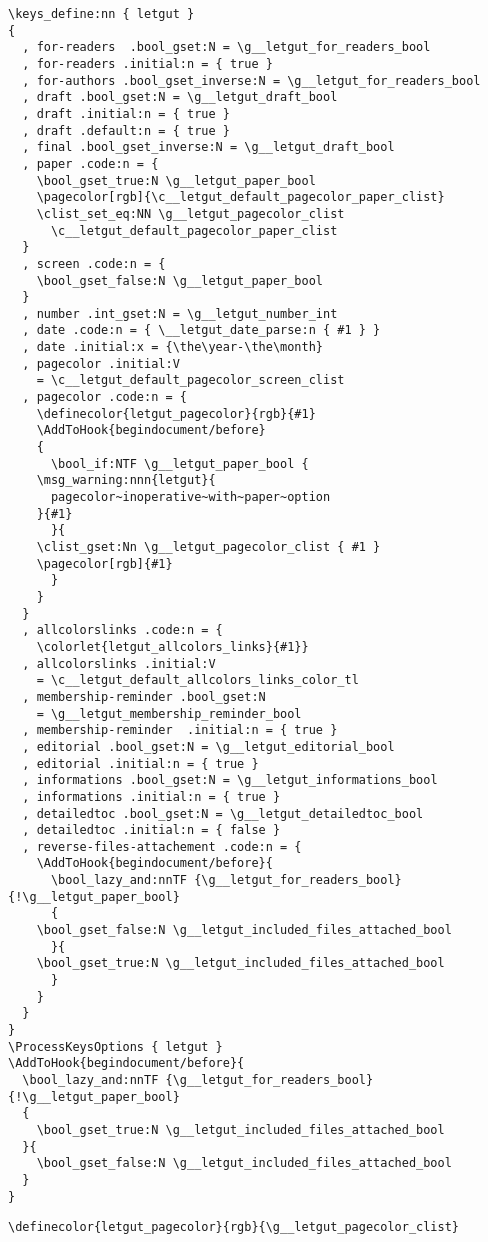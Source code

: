 \documentclass{letgut}
\begin{document}
\begin{lstlisting}
\keys_define:nn { letgut }
{
  , for-readers  .bool_gset:N = \g__letgut_for_readers_bool
  , for-readers .initial:n = { true }
  , for-authors .bool_gset_inverse:N = \g__letgut_for_readers_bool
  , draft .bool_gset:N = \g__letgut_draft_bool
  , draft .initial:n = { true }
  , draft .default:n = { true }
  , final .bool_gset_inverse:N = \g__letgut_draft_bool
  , paper .code:n = {
    \bool_gset_true:N \g__letgut_paper_bool
    \pagecolor[rgb]{\c__letgut_default_pagecolor_paper_clist}
    \clist_set_eq:NN \g__letgut_pagecolor_clist
      \c__letgut_default_pagecolor_paper_clist
  }
  , screen .code:n = {
    \bool_gset_false:N \g__letgut_paper_bool
  }
  , number .int_gset:N = \g__letgut_number_int
  , date .code:n = { \__letgut_date_parse:n { #1 } }
  , date .initial:x = {\the\year-\the\month}
  , pagecolor .initial:V
    = \c__letgut_default_pagecolor_screen_clist
  , pagecolor .code:n = {
    \definecolor{letgut_pagecolor}{rgb}{#1}
    \AddToHook{begindocument/before}
    {
      \bool_if:NTF \g__letgut_paper_bool {
	\msg_warning:nnn{letgut}{
	  pagecolor~inoperative~with~paper~option
	}{#1}
      }{
	\clist_gset:Nn \g__letgut_pagecolor_clist { #1 }
	\pagecolor[rgb]{#1}
      }
    }
  }
  , allcolorslinks .code:n = {
    \colorlet{letgut_allcolors_links}{#1}}
  , allcolorslinks .initial:V
    = \c__letgut_default_allcolors_links_color_tl
  , membership-reminder .bool_gset:N
    = \g__letgut_membership_reminder_bool
  , membership-reminder  .initial:n = { true }
  , editorial .bool_gset:N = \g__letgut_editorial_bool
  , editorial .initial:n = { true }
  , informations .bool_gset:N = \g__letgut_informations_bool
  , informations .initial:n = { true }
  , detailedtoc .bool_gset:N = \g__letgut_detailedtoc_bool
  , detailedtoc .initial:n = { false }
  , reverse-files-attachement .code:n = {
    \AddToHook{begindocument/before}{
      \bool_lazy_and:nnTF {\g__letgut_for_readers_bool} {!\g__letgut_paper_bool}
      {
	\bool_gset_false:N \g__letgut_included_files_attached_bool
      }{
	\bool_gset_true:N \g__letgut_included_files_attached_bool
      }
    }
  }
}
\ProcessKeysOptions { letgut }
\AddToHook{begindocument/before}{
  \bool_lazy_and:nnTF {\g__letgut_for_readers_bool} {!\g__letgut_paper_bool}
  {
    \bool_gset_true:N \g__letgut_included_files_attached_bool
  }{
    \bool_gset_false:N \g__letgut_included_files_attached_bool
  }
}
\end{lstlisting}

\begin{lstlisting}
\definecolor{letgut_pagecolor}{rgb}{\g__letgut_pagecolor_clist}
\end{lstlisting}
\end{document}
